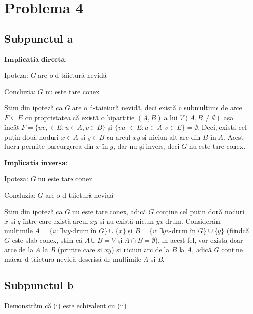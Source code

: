 \documentclass{article}
\begin{document}
\section*{\fontsize{20}{50}\selectfont Problema 4}
\subsection*{\fontsize{16}{30}\selectfont Subpunctul a}
{\fontsize{14}{16}\selectfont
$\mathbf{Implicatia}$ $\mathbf{directa:}$
\\
\par Ipoteza: $G$ are o d-tăietură nevidă
\par Concluzia: $G$ nu este tare conex
\\
\par Știm din ipoteză ca $G$ are o d-taietură nevidă, deci există o submulțime de arce $F \subseteq E$ cu proprietatea că există o bipartiție $(A, B)$ a lui $V (A, B \neq \emptyset)$ așa încât $F = \lbrace uv, \in E : u \in A, v \in B\rbrace$ și $\lbrace vu, \in E : u \in A, v \in B \rbrace = \emptyset$. Deci, există cel puțin două noduri $x \in A$ și $y \in B$ cu arcul $xy$ și niciun alt arc din $B$ în $A$. Acest lucru permite parcurgerea din $x$ în $y$, dar nu și invers, deci $G$ nu este tare conex.
\\
\par $\mathbf{Implicatia}$ $\mathbf{inversa:}$
\\
\par Ipoteza: $G$ nu este tare conex
\par Concluzia: $G$ are o d-tăietură nevidă
\\
\par Știm din ipoteză ca $G$ nu este tare conex, adică $G$ conține cel puțin două noduri $x$ și $y$ între care există arcul $xy$ și nu există niciun $yx$-drum. Considerăm mulțimile $A = \lbrace u : \exists uy$-drum în $ G\rbrace \cup \lbrace x \rbrace$ și $B = \lbrace v : \exists yv$-drum în $ G\rbrace \cup \lbrace y \rbrace$ (fiindcă $G$ este slab conex, știm că $A \cup B = V$ și $A \cap B = \emptyset$). În acest fel, vor exista doar arce de la $A$ la $B$ (printre care și $xy$) și niciun arc de la $B$ la $A$, adică $G$ conține măcar d-tăietura nevidă descrisă de mulțimile $A$ și $B$.

\subsection*{\fontsize{16}{30}\selectfont Subpunctul b}
Demonstrăm că (i) este echivalent cu (ii)

}
\end{document}

